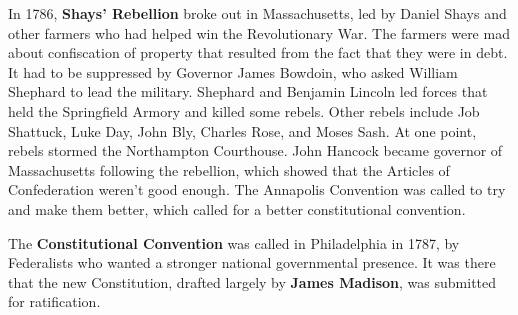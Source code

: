In 1786, \textbf{Shays' Rebellion} broke out in Massachusetts,
led by Daniel Shays and other farmers who had helped win the Revolutionary War.
The farmers were mad about confiscation of property that resulted from the fact that they were in debt.
It had to be suppressed by Governor James Bowdoin, who asked William Shephard to lead the military.
Shephard and Benjamin Lincoln led forces that held the Springfield Armory and killed some rebels.
Other rebels include Job Shattuck, Luke Day, John Bly, Charles Rose, and Moses Sash.
At one point, rebels stormed the Northampton Courthouse.
John Hancock became governor of Massachusetts following the rebellion,
which showed that the Articles of Confederation weren't good enough.
The Annapolis Convention was called to try and make them better,
which called for a better constitutional convention.

The \textbf{Constitutional Convention} was called in Philadelphia in 1787,
by Federalists who wanted a stronger national governmental presence.
It was there that the new Constitution, drafted largely by \textbf{James Madison},
was submitted for ratification.

